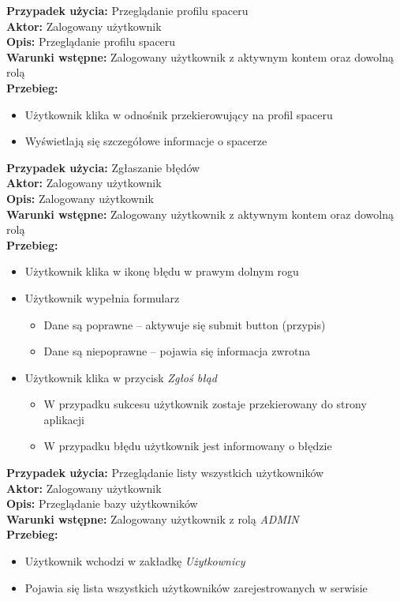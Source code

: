 \noindent
\textbf{Przypadek użycia:} Przeglądanie profilu spaceru\\
\textbf{Aktor:} Zalogowany użytkownik\\
\textbf{Opis:} Przeglądanie profilu spaceru\\
\textbf{Warunki wstępne:} Zalogowany użytkownik z aktywnym kontem oraz dowolną rolą\\
\textbf{Przebieg:}
\begin{itemize}
    \item Użytkownik klika w odnośnik przekierowujący na profil spaceru
    \item Wyświetlają się szczegółowe informacje o spacerze
\end{itemize}

\noindent
\textbf{Przypadek użycia:} Zgłaszanie błędów\\
\textbf{Aktor:} Zalogowany użytkownik\\
\textbf{Opis:}  Zalogowany użytkownik\\
\textbf{Warunki wstępne:} Zalogowany użytkownik z aktywnym kontem oraz dowolną rolą\\
\textbf{Przebieg:}
\begin{itemize}
    \item Użytkownik klika w ikonę błędu w prawym dolnym rogu
    \item Użytkownik wypełnia formularz
    \begin{itemize}
        \item Dane są poprawne -- aktywuje się submit button (przypis)
        \item Dane są niepoprawne -- pojawia się informacja zwrotna
    \end{itemize}
    \item Użytkownik klika w przycisk \textit{Zgłoś błąd}
    \begin{itemize}
        \item W przypadku sukcesu użytkownik zostaje przekierowany do strony aplikacji
        \item W przypadku błędu użytkownik jest informowany o błędzie
    \end{itemize}
\end{itemize}

\noindent
\textbf{Przypadek użycia:} Przeglądanie listy wszystkich użytkowników\\
\textbf{Aktor:} Zalogowany użytkownik\\
\textbf{Opis:} Przeglądanie bazy użytkowników\\
\textbf{Warunki wstępne:} Zalogowany użytkownik z rolą \textit{ADMIN}\\
\textbf{Przebieg:}
\begin{itemize}
    \item Użytkownik wchodzi w zakładkę \textit{Użytkownicy}
    \item Pojawia się lista wszystkich użytkowników zarejestrowanych w serwisie 
\end{itemize}

